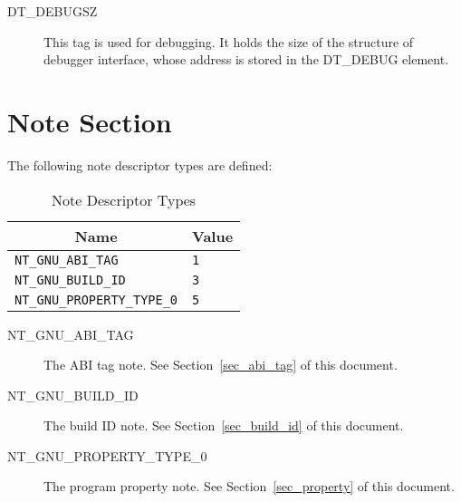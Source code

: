 \begin{description}
 \item[DT_DEBUGSZ]
   This tag is used for debugging.  It holds the size of the structure
   of debugger interface, whose address is stored in the DT_DEBUG
   element.
\end{description}

\section{Note Section}

The following note descriptor types are defined:

\begin{table}[H]
\Hrule
  \caption{Note Descriptor Types}
  \begin{center}
    \begin{tabular}[t]{l|l}
      \multicolumn{1}{c}{Name} & \multicolumn{1}{c}{Value} \\
      \hline
      \texttt{NT_GNU_ABI_TAG} & \texttt{1} \\
      \texttt{NT_GNU_BUILD_ID} & \texttt{3} \\
      \texttt{NT_GNU_PROPERTY_TYPE_0} & \texttt{5} \\
    \end{tabular}
  \end{center}
\Hrule
\end{table}

\begin{description}
 \item[NT_GNU_ABI_TAG]
   The ABI tag note.  See Section~\ref{sec_abi_tag} of this document.
 \item[NT_GNU_BUILD_ID]
   The build ID note.  See Section~\ref{sec_build_id} of this document.
 \item[NT_GNU_PROPERTY_TYPE_0]
   The program property note.  See Section~\ref{sec_property} of this
   document.
\end{description}


